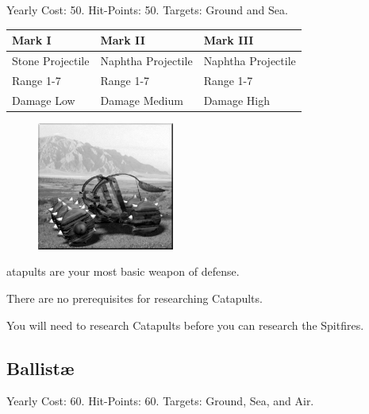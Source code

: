 
\begin{center}
	Yearly Cost: 50. Hit-Points: 50. Targets: Ground and Sea.
\end{center}

\begin{tabular}{ | p{1.3in} | p{1.3in} | p{1.3in} |}
	\hline
	\textbf{Mark I}	& \textbf{Mark II} & \textbf{Mark III} \\ \hline
	Stone Projectile	& Naphtha Projectile & Naphtha Projectile \\ \hline
	Range 1-7	& Range 1-7& Range 1-7 \\ \hline
	Damage Low	& Damage Medium & Damage High \\ \hline
\end{tabular}

\begin{figure}
	\vspace{-20pt}
	\begin{center}
		\includegraphics[width=0.4\textwidth]{Acatapult}
	\end{center}
	\vspace{-50pt}
\end{figure}

atapults are your most basic weapon of defense. 

There are no prerequisites for researching Catapults. 

You will need to research Catapults before you can research the Spitfires.

\subsection{Ballistæ}



\begin{center}
	Yearly Cost: 60. Hit-Points: 60. Targets: Ground, Sea, and Air.
\end{center}


